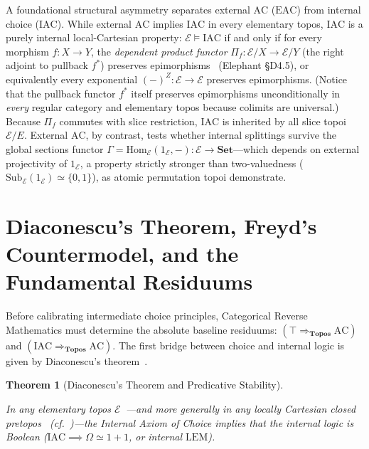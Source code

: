 \documentclass[10pt,twoside,openright]{book}
\theoremstyle{crmplain}
\newtheorem{theorem}{Theorem}[section]
\theoremstyle{crmdef}
\theoremstyle{crmremark}
\begin{document}
A foundational structural asymmetry separates external $\mathrm{AC}$ ($\mathrm{EAC}$) from internal choice ($\mathrm{IAC}$). While external $\mathrm{AC}$ implies $\mathrm{IAC}$ in every elementary topos, $\mathrm{IAC}$ is a purely internal local-Cartesian property: $\mathcal{E} \models \mathrm{IAC}$ if and only if for every morphism $f: X \to Y$, the \emph{dependent product functor} $\Pi_f: \mathcal{E}/X \to \mathcal{E}/Y$ (the right adjoint to pullback $f^*$) preserves epimorphisms~\cite{Johnstone02} (Elephant \S D4.5), or equivalently every exponential $(-)^Z : \mathcal{E} \to \mathcal{E}$ preserves epimorphisms. (Notice that the pullback functor $f^*$ itself preserves epimorphisms unconditionally in \emph{every} regular category and elementary topos because colimits are universal.) Because $\Pi_f$ commutes with slice restriction, $\mathrm{IAC}$ is inherited by all slice topoi $\mathcal{E}/E$. External $\mathrm{AC}$, by contrast, tests whether internal splittings survive the global sections functor $\Gamma = \mathrm{Hom}_{\mathcal{E}}(1_{\mathcal{E}}, -): \mathcal{E} \to \mathbf{Set}$---which depends on external projectivity of $1_{\mathcal{E}}$, a property strictly stronger than two-valuedness ($\mathrm{Sub}_{\mathcal{E}}(1_{\mathcal{E}}) \simeq \{0, 1\}$), as atomic permutation topoi demonstrate.

\section{Diaconescu's Theorem, Freyd's Countermodel, and the Fundamental Residuums}

Before calibrating intermediate choice principles, Categorical Reverse Mathematics must determine the absolute baseline residuums: $(\top \Rightarrow_{\mathbf{Topos}} \mathrm{AC})$ and $(\mathrm{IAC} \Rightarrow_{\mathbf{Topos}} \mathrm{AC})$. The first bridge between choice and internal logic is given by Diaconescu's theorem~\cite{Diaconescu75}.

\begin{theorem}[Diaconescu's Theorem and Predicative Stability]\label{thm:diaconescu}%
%

In any elementary topos $\mathcal{E}$~\cite{Diaconescu75}---and more generally in any locally Cartesian closed pretopos~\cite[\S D4.5, Thm.~D4.5.1--Cor.~D4.5.2]{Johnstone02} (cf.~\cite{Maietti05})---the Internal Axiom of Choice implies that the internal logic is Boolean ($\mathrm{IAC} \implies \Omega \simeq 1+1$, or internal $\mathrm{LEM}$).

\end{theorem}
\end{document}
